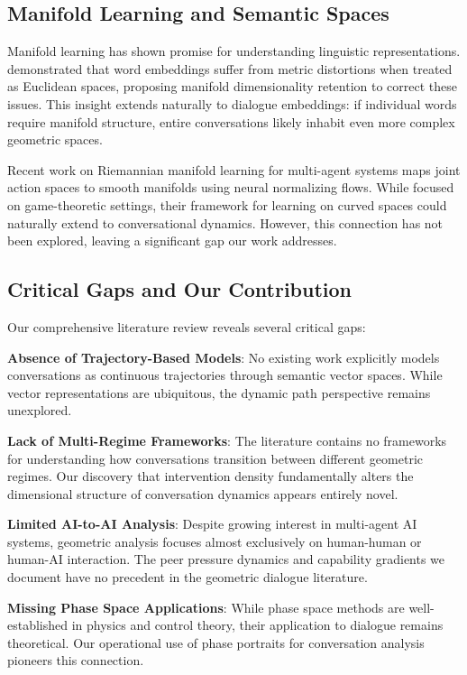 \documentclass[11pt,letterpaper]{article}
\begin{document}
\subsection{Manifold Learning and Semantic Spaces}

Manifold learning has shown promise for understanding linguistic representations. \citep{hasan2017manifold} demonstrated that word embeddings suffer from metric distortions when treated as Euclidean spaces, proposing manifold dimensionality retention to correct these issues. This insight extends naturally to dialogue embeddings: if individual words require manifold structure, entire conversations likely inhabit even more complex geometric spaces.

Recent work on Riemannian manifold learning for multi-agent systems \citep{liu2025riemannian} maps joint action spaces to smooth manifolds using neural normalizing flows. While focused on game-theoretic settings, their framework for learning on curved spaces could naturally extend to conversational dynamics. However, this connection has not been explored, leaving a significant gap our work addresses.

\subsection{Critical Gaps and Our Contribution}

Our comprehensive literature review reveals several critical gaps:

\textbf{Absence of Trajectory-Based Models}: No existing work explicitly models conversations as continuous trajectories through semantic vector spaces. While vector representations are ubiquitous, the dynamic path perspective remains unexplored.

\textbf{Lack of Multi-Regime Frameworks}: The literature contains no frameworks for understanding how conversations transition between different geometric regimes. Our discovery that intervention density fundamentally alters the dimensional structure of conversation dynamics appears entirely novel.

\textbf{Limited AI-to-AI Analysis}: Despite growing interest in multi-agent AI systems, geometric analysis focuses almost exclusively on human-human or human-AI interaction. The peer pressure dynamics and capability gradients we document have no precedent in the geometric dialogue literature.

\textbf{Missing Phase Space Applications}: While phase space methods are well-established in physics and control theory, their application to dialogue remains theoretical. Our operational use of phase portraits for conversation analysis pioneers this connection.
\end{document}
